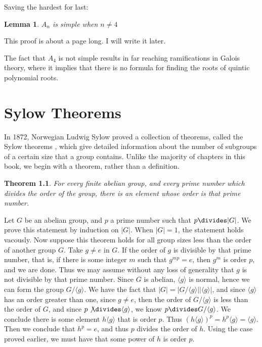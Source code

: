 \documentclass[12pt]{amsbook}
\makeatletter
\theoremstyle{plain}
\newtheorem{theorem}{Theorem}[chapter]
\newtheorem{lemma}[theorem]{Lemma}
\theoremstyle{definition}
\renewenvironment{proof}[1][\proofname]{\par
  \pushQED{\qed}%
  \normalfont \topsep6\p@\@plus6\p@\relax
  \list{}{\leftmargin=0em
          \rightmargin=\leftmargin
          \settowidth{\itemindent}{\itshape#1}%
          \labelwidth=\itemindent}

  \item[\hskip\labelsep
        \itshape
    #1\@addpunct{.}]\ignorespaces
}{%
  \popQED\endlist\@endpefalse
}
\makeatother
\begin{document}
Saving the hardest for last:

\begin{lemma} $A_n$ is simple when $n \neq 4$ \end{lemma}
\begin{proof}
    This proof is about a page long. I will write it later.
\end{proof}

The fact that $A_4$ is not simple results in far reaching ramifications in Galois theory, where it implies that there is no formula for finding the roots of quintic polynomial roots.












\chapter{Sylow Theorems}

In 1872, Norwegian Ludwig Sylow proved a collection of theorems, called the Sylow theorems , which give detailed information about the number of subgroups of a certain size that a group contains. Unlike the majority of chapters in this book, we begin with a theorem, rather than a definition.

\begin{theorem}
    For every finite abelian group, and every prime number which divides the order of the group, there is an element whose order is that prime number.
\end{theorem}
\begin{proof}
    Let $G$ be an abelian group, and $p$ a prime number such that $p \divides |G|$. We prove this statement by induction on $|G|$. When $|G| = 1$, the statement holds vacously. Now suppose this theorem holds for all group sizes less than the order of another group $G$. Take $g \neq e$ in $G$. If the order of $g$ is divisible by that prime number, that is, if there is some integer $m$ such that $g^{mp} = e$, then $g^m$ is order $p$, and we are done. Thus we may assume without any loss of generality that $g$ is not divisible by that prime number. Since $G$ is abelian, $\langle g \rangle$ is normal, hence we can form the group $G/\langle g \rangle$. We have the fact that $|G| = |G/\langle g \rangle| |\langle g \rangle|$, and since $\langle g \rangle$ has an order greater than one, since $g \neq e$, then the order of $G/\langle g \rangle$ is less than the order of $G$, and since $p \not \divides \langle g \rangle$, we know $p \divides G/\langle g \rangle$. We conclude there is some element $h\langle g \rangle$ that is order $p$. Thus $(h \langle g \rangle)^p = h^p \langle g \rangle = \langle g \rangle$. Then we conclude that $h^p = e$, and thus $p$ divides the order of $h$. Using the case proved earlier, we must have that some power of $h$ is order $p$.
\end{proof}
\end{document}
